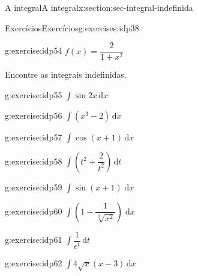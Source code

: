\documentclass[oneside,10pt,]{article}
\numberwithin{equation}{section}
\newcommand{\dd}{\mathrm{d}}
\begin{document}
\begin{sectionptx}{A integral}{}{A integral}{}{}{x:section:sec-integral-indefinida}
\begin{exercises-subsection}{Exercícios}{}{Exercícios}{}{}{g:exercises:idp38}
\begin{exercisegroupcol}{2}
\begin{divisionexerciseegcol}{16}{}{}{g:exercise:idp54}
\(f(x) = \dfrac{2}{1+x^2}\)\end{divisionexerciseegcol}%
\end{exercisegroupcol}
\par\medskip\noindent
\par\medskip\noindent%
%
Encontre as integrais indefinidas.%
\begin{exercisegroupcol}{2}
\begin{divisionexerciseegcol}{17}{}{}{g:exercise:idp55}%
\(\displaystyle\int\sin{2x}\,\dd x\)\end{divisionexerciseegcol}%
\begin{divisionexerciseegcol}{18}{}{}{g:exercise:idp56}%
\(\displaystyle\int \left(x^3-2\right)\,\dd x\)\end{divisionexerciseegcol}%
\begin{divisionexerciseegcol}{19}{}{}{g:exercise:idp57}%
\(\displaystyle\int\cos(x+1)\,\dd x\)\end{divisionexerciseegcol}%
\begin{divisionexerciseegcol}{20}{}{}{g:exercise:idp58}%
\(\displaystyle\int\left(t^2 + \dfrac{2}{t^2}\right)\,\dd t\)\end{divisionexerciseegcol}%
\begin{divisionexerciseegcol}{21}{}{}{g:exercise:idp59}%
\(\displaystyle\int\sin(x+1)\;\dd x\)\end{divisionexerciseegcol}%
\begin{divisionexerciseegcol}{22}{}{}{g:exercise:idp60}%
\(\displaystyle\int\left(1-\dfrac{1}{\sqrt[3]{x^2}}\right)\;\dd x\)\end{divisionexerciseegcol}%
\begin{divisionexerciseegcol}{23}{}{}{g:exercise:idp61}%
\(\displaystyle\int\dfrac{1}{e^t}\,\dd t\)\end{divisionexerciseegcol}%
\begin{divisionexerciseegcol}{24}{}{}{g:exercise:idp62}%
\(\displaystyle\int 4\sqrt{x}\left(x-3\right)\,\dd x\)\end{divisionexerciseegcol}%
\end{exercisegroupcol}
\par\medskip\noindent
\end{exercises-subsection}
\end{sectionptx}
%
%
\typeout{************************************************}
\typeout{************************************************}
%
\end{document}
